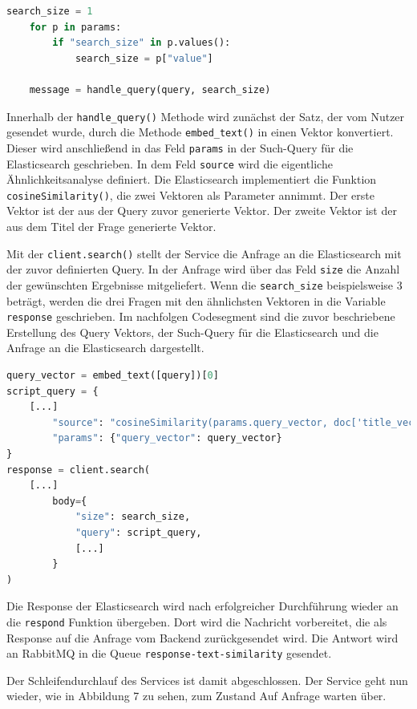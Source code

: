 \begin{lstlisting}[language=Python]
search_size = 1
    for p in params:
        if "search_size" in p.values():
            search_size = p["value"]

    message = handle_query(query, search_size)
\end{lstlisting}

Innerhalb der \texttt{handle\_{}query()} Methode wird zunächst der Satz, der vom Nutzer gesendet wurde, durch die Methode \texttt{embed\_{}text()} in einen Vektor konvertiert. Dieser  wird anschließend in das Feld \texttt{\glqq params\grqq{}} in der Such-Query für die Elasticsearch geschrieben. In dem Feld \texttt{\glqq source\grqq{}} wird die eigentliche Ähnlichkeitsanalyse definiert. Die Elasticsearch implementiert die Funktion \texttt{cosineSimilarity()}, die zwei Vektoren als Parameter annimmt. Der erste Vektor ist der  aus der Query zuvor generierte Vektor. Der zweite Vektor ist der aus dem Titel der Frage generierte Vektor. 

Mit der \texttt{client.search()} stellt der Service die Anfrage an die Elasticsearch mit der zuvor definierten Query. In der Anfrage wird über das Feld \texttt{\glqq size\grqq} die Anzahl der gewünschten Ergebnisse mitgeliefert. Wenn die \texttt{search\_{}size} beispielsweise 3 beträgt, werden die drei Fragen mit den ähnlichsten Vektoren in die Variable \texttt{response} geschrieben. Im nachfolgen Codesegment sind die zuvor beschriebene Erstellung des Query Vektors, der Such-Query für die Elasticsearch und die Anfrage an die Elasticsearch dargestellt.

\begin{lstlisting}[language=Python]
query_vector = embed_text([query])[0]
script_query = {
    [...]
        "source": "cosineSimilarity(params.query_vector, doc['title_vector']) + 1.0",
        "params": {"query_vector": query_vector}  
}
response = client.search(
    [...]
        body={
            "size": search_size,
            "query": script_query,
            [...]
        }
)
\end{lstlisting}

Die Response der Elasticsearch wird nach erfolgreicher Durchführung wieder an die \texttt{respond} Funktion übergeben. Dort wird die Nachricht vorbereitet, die als Response auf die Anfrage vom Backend zurückgesendet wird. Die Antwort wird an RabbitMQ in die Queue \texttt{response-text-similarity} gesendet.

Der Schleifendurchlauf des Services ist damit abgeschlossen. Der Service geht nun wieder, wie in Abbildung 7 zu sehen, zum Zustand \glqq Auf Anfrage warten\grqq{} über. 

